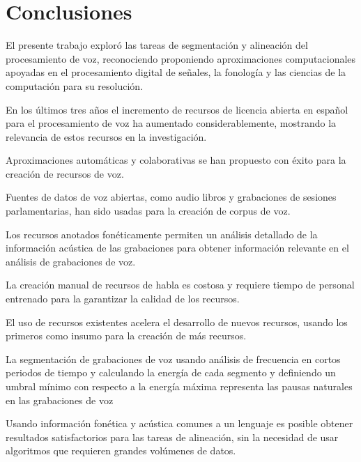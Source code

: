 \chapter{Conclusiones}

El presente trabajo exploró las tareas de segmentación y alineación del procesamiento de voz, reconociendo proponiendo aproximaciones computacionales apoyadas en el procesamiento digital de señales, la fonología y las ciencias de la computación para su resolución.

En los últimos tres años el incremento de recursos de licencia abierta en español para el procesamiento de voz ha aumentado considerablemente, mostrando la relevancia de estos recursos en la investigación.

Aproximaciones automáticas y colaborativas se han propuesto con éxito para la creación de recursos de voz.

Fuentes de datos de voz abiertas, como audio libros y grabaciones de sesiones parlamentarias, han sido usadas para la creación de corpus de voz.

Los recursos anotados fonéticamente permiten un análisis detallado de la información acústica de las grabaciones para obtener información relevante en el análisis de grabaciones de voz.

La creación manual de recursos de habla es costosa y requiere tiempo de personal entrenado para la garantizar la calidad de los recursos.

El uso de recursos existentes acelera el desarrollo de nuevos recursos, usando los primeros como insumo para la creación de más recursos.

La segmentación de grabaciones de voz usando análisis de frecuencia en cortos periodos de tiempo y calculando la energía de cada segmento y definiendo un umbral mínimo con respecto a la energía máxima representa las pausas naturales en las grabaciones de voz

Usando información fonética y acústica comunes a un lenguaje es posible obtener resultados satisfactorios para las tareas de alineación, sin la necesidad de usar algoritmos que requieren grandes volúmenes de datos.
